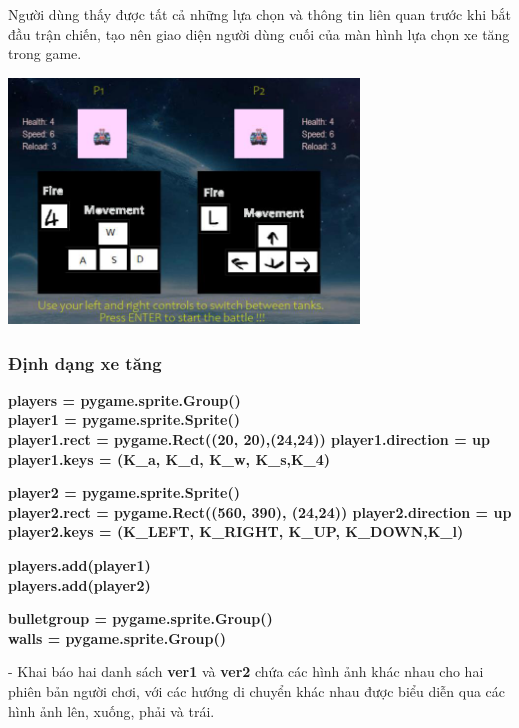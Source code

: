 \documentclass[a4paper]{article}
\begin{document}
Người dùng thấy được tất cả những lựa chọn và thông tin liên quan trước
khi bắt đầu trận chiến, tạo nên giao diện người dùng cuối của màn hình
lựa chọn xe tăng trong game.

\includegraphics[width=3.66528in,height=2.56528in]{image35.png}
\newpage
\subsubsection{Định dạng xe tăng}
\textbf{players = pygame.sprite.Group()}\\
\textbf{player1 = pygame.sprite.Sprite()}\\
\textbf{player1.rect = pygame.Rect((20, 20),(24,24)) player1.direction =
\textquotesingle up\textquotesingle{}}\\
\textbf{player1.keys = (K\_a, K\_d, K\_w, K\_s,K\_4)}

\textbf{player2 = pygame.sprite.Sprite()}\\
\textbf{player2.rect = pygame.Rect((560, 390), (24,24))
player2.direction = \textquotesingle up\textquotesingle{}}\\
\textbf{player2.keys = (K\_LEFT, K\_RIGHT, K\_UP, K\_DOWN,K\_l)}

\textbf{players.add(player1)}\\
\textbf{players.add(player2)}

\textbf{bulletgroup = pygame.sprite.Group()}\\
\textbf{walls = pygame.sprite.Group()}

- Khai báo hai danh sách \textbf{ver1} và \textbf{ver2} chứa các hình
ảnh khác nhau cho hai phiên bản người chơi, với các hướng di chuyển khác
nhau được biểu diễn qua các hình ảnh lên, xuống, phải và trái.
\end{document}
